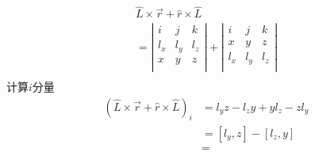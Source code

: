 $$
\begin{array}{l}
	\hat{L}\times \vec{r}+\hat{r}\times \hat{L}\\
	=\left| \begin{matrix}
	i&		j&		k\\
	l_x&		l_y&		l_z\\
	x&		y&		z\\
\end{matrix} \right|+\left| \begin{matrix}
	i&		j&		k\\
	x&		y&		z\\
	l_x&		l_y&		l_z\\
\end{matrix} \right|\\
\end{array}
$$
计算$i$分量
\begin{align}
\left(\hat{L}\times \vec{r}+\hat{r}\times \hat{L}\right)_i&= l_yz-l_zy+yl_z-zl_y\\
&=\left[ l_y,z \right] -\left[ l_z,y \right]\\
&=
\end{align}

